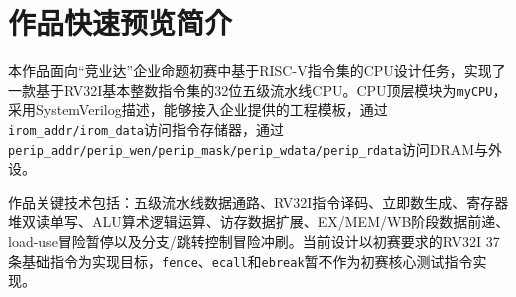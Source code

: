 \documentclass[12pt,a4paper]{ctexart}
\newcommand{\code}[1]{\texttt{#1}}
\begin{document}
\tableofcontents
\newpage

\section*{作品快速预览简介}

本作品面向``竞业达''企业命题初赛中基于RISC-V指令集的CPU设计任务，实现了一款基于RV32I基本整数指令集的32位五级流水线CPU。CPU顶层模块为\code{myCPU}，采用SystemVerilog描述，能够接入企业提供的工程模板，通过\code{irom\_addr/irom\_data}访问指令存储器，通过\code{perip\_addr/perip\_wen/perip\_mask/perip\_wdata/perip\_rdata}访问DRAM与外设。

作品关键技术包括：五级流水线数据通路、RV32I指令译码、立即数生成、寄存器堆双读单写、ALU算术逻辑运算、访存数据扩展、EX/MEM/WB阶段数据前递、load-use冒险暂停以及分支/跳转控制冒险冲刷。当前设计以初赛要求的RV32I 37条基础指令为实现目标，\code{fence}、\code{ecall}和\code{ebreak}暂不作为初赛核心测试指令实现。
\end{document}
